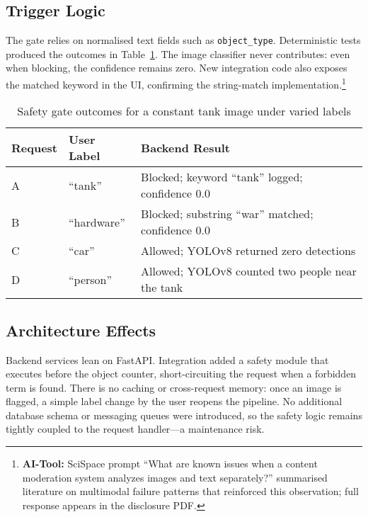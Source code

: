 \documentclass[conference]{IEEEtran}
\begin{document}
\subsection{Trigger Logic}
The gate relies on normalised text fields such as \texttt{object\_type}. Deterministic tests produced the outcomes in Table~\ref{tab:trigger-outcomes}. The image classifier never contributes: even when blocking, the confidence remains zero. New integration code also exposes the matched keyword in the UI, confirming the string-match implementation.\footnote{\textbf{AI-Tool:} SciSpace prompt ``What are known issues when a content moderation system analyzes images and text separately?'' summarised literature on multimodal failure patterns that reinforced this observation; full response appears in the disclosure PDF.}

\begin{table}[!t]
\caption{Safety gate outcomes for a constant tank image under varied labels}
\label{tab:trigger-outcomes}
\centering
\begin{tabular}{>{\raggedright\arraybackslash}p{}>{\raggedright\arraybackslash}p{}>{\raggedright\arraybackslash}p{}}
\hline
\textbf{Request} & \textbf{User Label} & \textbf{Backend Result} \\
\hline
A & ``tank'' & Blocked; keyword ``tank'' logged; confidence 0.0\\
B & ``hardware'' & Blocked; substring ``war'' matched; confidence 0.0\\
C & ``car'' & Allowed; YOLOv8 returned zero detections\\
D & ``person'' & Allowed; YOLOv8 counted two people near the tank\\
\hline
\end{tabular}
\end{table}

\subsection{Architecture Effects}
Backend services lean on FastAPI. Integration added a safety module that executes before the object counter, short-circuiting the request when a forbidden term is found. There is no caching or cross-request memory: once an image is flagged, a simple label change by the user reopens the pipeline. No additional database schema or messaging queues were introduced, so the safety logic remains tightly coupled to the request handler---a maintenance risk.
\end{document}
